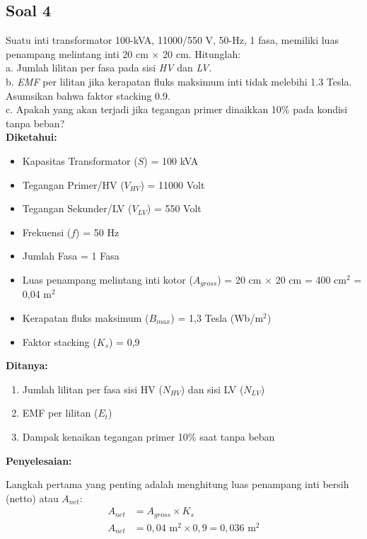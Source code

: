 \documentclass[12pt, a4paper]{article}
\begin{document}
\subsection*{Soal 4}
Suatu inti transformator 100-kVA, 11000/550 V, 50-Hz, 1 fasa, memiliki luas penampang melintang inti 20 cm $\times$ 20 cm. Hitunglah:\\
a. Jumlah lilitan per fasa pada sisi \textit{HV} dan \textit{LV}.\\
b. \textit{EMF} per lilitan jika kerapatan fluks maksimum inti tidak melebihi 1.3 Tesla. Asumsikan bahwa faktor stacking 0.9.\\
c. Apakah yang akan terjadi jika tegangan primer dinaikkan 10\% pada kondisi tanpa beban?\\

\textbf{Diketahui:}
\begin{itemize}
    \item Kapasitas Transformator ($S$) = 100 kVA
    \item Tegangan Primer/HV ($V_{HV}$) = 11000 Volt
    \item Tegangan Sekunder/LV ($V_{LV}$) = 550 Volt
    \item Frekuensi ($f$) = 50 Hz
    \item Jumlah Fasa = 1 Fasa
    \item Luas penampang melintang inti kotor ($A_{gross}$) = 20 cm $\times$ 20 cm = 400 cm$^2$ = 0,04 m$^2$
    \item Kerapatan fluks maksimum ($B_{max}$) = 1,3 Tesla (Wb/m$^2$)
    \item Faktor stacking ($K_s$) = 0,9
\end{itemize}

\textbf{Ditanya:}
\begin{enumerate}[label=\alph*.]
    \item Jumlah lilitan per fasa sisi HV ($N_{HV}$) dan sisi LV ($N_{LV}$)
    \item EMF per lilitan ($E_t$)
    \item Dampak kenaikan tegangan primer 10\% saat tanpa beban
\end{enumerate}

\textbf{Penyelesaian:}

Langkah pertama yang penting adalah menghitung luas penampang inti bersih (netto) atau $A_{net}$:
\begin{align*}
    A_{net} &= A_{gross} \times K_s \\
    A_{net} &= 0,04 \text{ m}^2 \times 0,9 = 0,036 \text{ m}^2
\end{align*}
\end{document}
